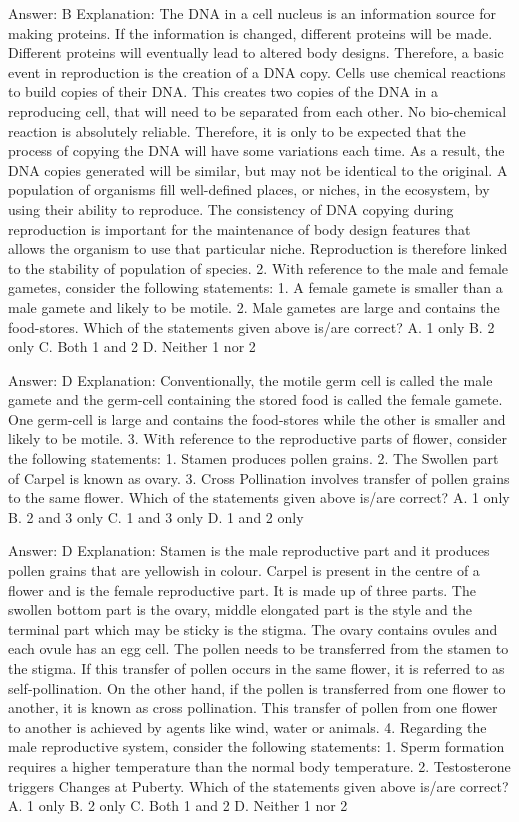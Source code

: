 Answer: B
Explanation: The DNA in a cell nucleus is an information source for making proteins. If the information is changed, different proteins will be made. Different proteins will eventually lead to altered body designs. Therefore, a basic event in reproduction is the creation of a DNA copy. Cells use chemical reactions to build copies of their DNA. This creates two copies of the DNA in a reproducing cell, that will need to be separated from each other. No bio-chemical reaction is absolutely reliable. Therefore, it is only to be expected that the process of copying the DNA will have some variations each time. As a result, the DNA copies generated will be similar, but may not be identical to the original. A population of organisms fill well-defined places, or niches, in the ecosystem, by using their ability to reproduce. The consistency of DNA copying during reproduction is important for the maintenance of body design features that allows the organism to use that particular niche. Reproduction is therefore linked to the stability of population of species. 2. With reference to the male and female gametes, consider the following statements: 1. A female gamete is smaller than a male gamete and likely to be motile. 2. Male gametes are large and contains the food-stores. Which of the statements given above is/are correct? A. 1 only B. 2 only C. Both 1 and 2 D. Neither 1 nor 2 

Answer: D
Explanation: Conventionally, the motile germ cell is called the male gamete and the germ-cell containing the stored food is called the female gamete. One germ-cell is large and contains the food-stores while the other is smaller and likely to be motile. 3. With reference to the reproductive parts of flower, consider the following statements: 1. Stamen produces pollen grains. 2. The Swollen part of Carpel is known as ovary. 3. Cross Pollination involves transfer of pollen grains to the same flower. Which of the statements given above is/are correct? A. 1 only B. 2 and 3 only C. 1 and 3 only D. 1 and 2 only 

Answer: D
Explanation: Stamen is the male reproductive part and it produces pollen grains that are yellowish in colour. Carpel is present in the centre of a flower and is the female reproductive part. It is made up of three parts. The swollen bottom part is the ovary, middle elongated part is the style and the terminal part which may be sticky is the stigma. The ovary contains ovules and each ovule has an egg cell. The pollen needs to be transferred from the stamen to the stigma. If this transfer of pollen occurs in the same flower, it is referred to as self-pollination. On the other hand, if the pollen is transferred from one flower to another, it is known as cross pollination. This transfer of pollen from one flower to another is achieved by agents like wind, water or animals. 4. Regarding the male reproductive system, consider the following statements: 1. Sperm formation requires a higher temperature than the normal body temperature. 2. Testosterone triggers Changes at Puberty. Which of the statements given above is/are correct? A. 1 only B. 2 only C. Both 1 and 2 D. Neither 1 nor 2 

